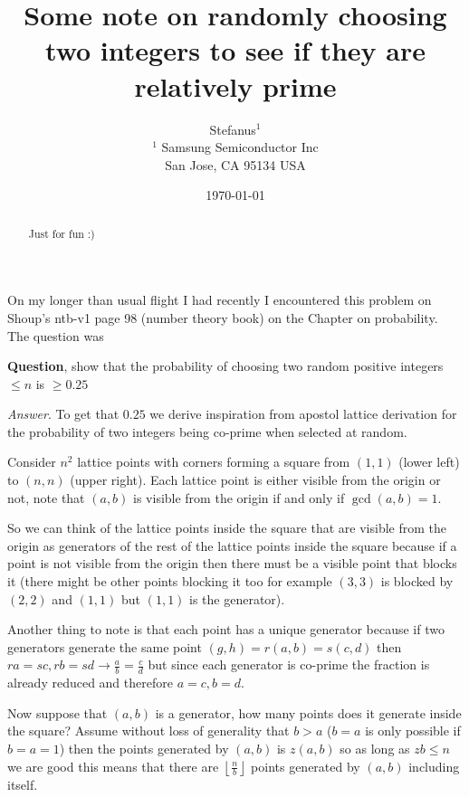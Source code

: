 \documentclass[aps,preprint,preprintnumbers,nofootinbib,showpacs,prd]{revtex4-1}
\begin{document}
\title{Some note on randomly choosing two integers to see if they are relatively prime}
\bigskip
\author{Stefanus$^1$\\
$^1$ Samsung Semiconductor Inc\\ San Jose, CA 95134 USA\\
}
%
\date{\today}
%
\begin{abstract}
Just for fun :)

\end{abstract}
%
\maketitle

\renewcommand{\theequation}{A.\arabic{equation}}  %
\setcounter{equation}{0}  %

On my longer than usual flight I had recently I encountered this problem on Shoup's ntb-v1 page 98 (number theory book) on the Chapter on probability. The question was 

{\bf Question}, show that the probability of choosing two random positive integers $\le n$ is $\ge 0.25$

{\it Answer}. To get that $0.25$ we derive inspiration from apostol lattice derivation for the probability of two integers being co-prime when selected at random.

Consider $n^2$ lattice points with corners forming a square from $(1,1)$ (lower left) to $(n,n)$ (upper right). Each lattice point is either visible from the origin or not, note that $(a,b)$ is visible from the origin if and only if $\gcd(a,b) = 1$.

So we can think of the lattice points inside the square that are visible from the origin as generators of the rest of the lattice points inside the square because if a point is not visible from the origin then there must be a visible point that blocks it (there might be other points blocking it too for example $(3,3)$ is blocked by $(2,2)$ and $(1,1)$ but $(1,1)$ is the generator).

Another thing to note is that each point has a unique generator because if two generators generate the same point $(g,h)=r(a,b) = s(c,d)$ then $ra = sc, rb = sd \to \frac{a}{b} = \frac{c}{d}$ but since each generator is co-prime the fraction is already reduced and therefore $a=c, b=d$.

Now suppose that $(a,b)$ is a generator, how many points does it generate inside the square? Assume without loss of generality that $b > a$ ($b =a$ is only possible if $b = a = 1$) then the points generated by $(a,b)$ is $z(a,b)$ so as long as $zb \le n$ we are good this means that there are $\left \lfloor \frac{n}{b} \right \rfloor$ points generated by $(a,b)$ including itself.
\end{document}
